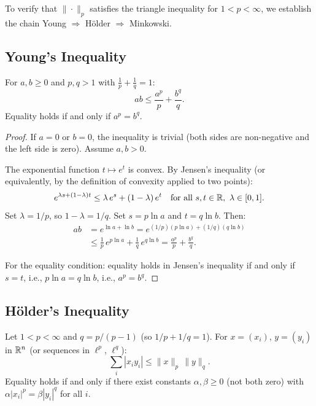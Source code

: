 \documentclass[11pt,a4paper]{article}
\begin{document}
To verify that $\|\cdot\|_p$ satisfies the triangle inequality for
$1 < p < \infty$, we establish the chain Young $\Rightarrow$ H\"older
$\Rightarrow$ Minkowski.

\subsection{Young's Inequality}

\begin{lemma}
\label{lem:young}
For $a, b \ge 0$ and $p, q > 1$ with $\frac{1}{p} + \frac{1}{q} = 1$:
\[
ab \le \frac{a^p}{p} + \frac{b^q}{q}.
\]
Equality holds if and only if $a^p = b^q$.
\end{lemma}

\begin{proof}
If $a = 0$ or $b = 0$, the inequality is trivial (both sides are
non-negative and the left side is zero). Assume $a, b > 0$.

The exponential function $t \mapsto e^t$ is convex. By Jensen's inequality
(or equivalently, by the definition of convexity applied to two points):
\[
e^{\lambda s + (1-\lambda) t} \le \lambda \, e^s + (1 - \lambda)\, e^t
\quad \text{for all } s, t \in \mathbb{R},\ \lambda \in [0,1].
\]
Set $\lambda = 1/p$, so $1 - \lambda = 1/q$. Set $s = p \ln a$ and
$t = q \ln b$. Then:
\begin{align*}
ab &= e^{\ln a + \ln b}
   = e^{(1/p)(p \ln a) + (1/q)(q \ln b)} \\
   &\le \frac{1}{p}\, e^{p \ln a} + \frac{1}{q}\, e^{q \ln b}
   = \frac{a^p}{p} + \frac{b^q}{q}.
\end{align*}

For the equality condition: equality holds in Jensen's inequality if and only
if $s = t$, i.e., $p \ln a = q \ln b$, i.e., $a^p = b^q$.
\end{proof}

\subsection{H\"older's Inequality}

\begin{proposition}
\label{prop:holder}
Let $1 < p < \infty$ and $q = p/(p-1)$ (so $1/p + 1/q = 1$). For
$x = (x_i)$, $y = (y_i)$ in $\mathbb{R}^n$ (or sequences in $\ell^p$, $\ell^q$):
\[
\sum_{i} |x_i y_i| \le \|x\|_p \, \|y\|_q.
\]
Equality holds if and only if there exist constants $\alpha, \beta \ge 0$
(not both zero) with $\alpha |x_i|^p = \beta |y_i|^q$ for all $i$.
\end{proposition}
\end{document}
